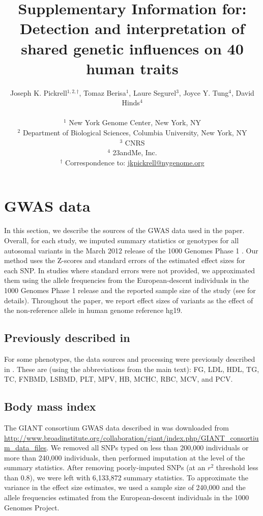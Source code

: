 \documentclass[11pt,titlepage]{article}
\begin{document}
\title{Supplementary Information for: Detection and interpretation of shared genetic influences on 40 human traits}
\author{Joseph K. Pickrell$^{1,2, \dagger}$, Tomaz Berisa${^1}$, Laure Segurel$^{3}$, Joyce Y. Tung${^4}$, David Hinds${^4}$\\ \\
\small $^1$ New York Genome Center, New York, NY\\
\small $^2$ Department of Biological Sciences, Columbia University, New York, NY \\
\small $^3$ CNRS \\
\small $^4$ 23andMe, Inc. \\
\small $^\dagger$ Correspondence to: \url{jkpickrell@nygenome.org}
}
\maketitle

\tableofcontents
\clearpage

\section{GWAS data}
In this section, we describe the sources of the GWAS data used in the paper. Overall, for each study, we imputed summary statistics or genotypes for all autosomal variants in the March 2012 release of the 1000 Genomes Phase 1 \citep{abecasis2010map}. Our method uses the Z-scores and standard errors of the estimated effect sizes for each SNP. In studies where standard errors were not provided, we approximated them using the allele frequencies from the European-descent individuals in the 1000 Genomes Phase 1 release and the reported sample size of the study (see \citet{pickrell2013joint} for details). Throughout the paper, we report effect sizes of variants as the effect of the non-reference allele in human genome reference hg19. 
  
\subsection{Previously described in \citet{pickrell2013joint}}
For some phenotypes, the data sources and processing were previously described in \citet{pickrell2013joint}. These are (using the abbreviations from the main text): FG, LDL, HDL, TG, TC,  FNBMD, LSBMD, PLT, MPV, HB, MCHC, RBC, MCV, and PCV. \subsection{Body mass index}
The GIANT consortium GWAS data described in \citet{Locke:2015aa} was downloaded from \url{http://www.broadinstitute.org/collaboration/giant/index.php/GIANT_consortium_data_files}. We removed all SNPs typed on less than 200,000 individuals or more than 240,000 individuals, then performed imputation at the level of the summary statistics. After removing poorly-imputed SNPs (at an $r^2$ threshold less than 0.8), we were left with 6,133,872 summary statistics. To approximate the variance in the effect size estimates, we used a sample size of 240,000 and the allele frequencies estimated from the European-descent individuals in the 1000 Genomes Project. 
\end{document}
